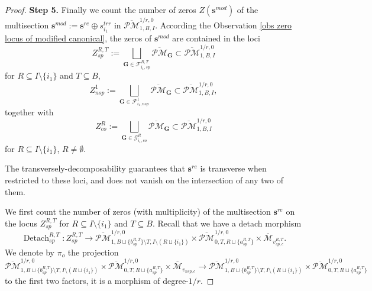 \documentclass[11pt]{amsart}
\theoremstyle{definition}
\theoremstyle{remark}
\newcommand{\oPMb}{{\overline{\mathcal{PM}}}}
\newcommand{\nontilde}{}
\newcommand{\<}{\left<}
\renewcommand{\>}{\right>}
\numberwithin{equation}{section}
\def\Mbar{{\overline{\mathcal M}}}
\begin{document}
\begin{proof}
        

    \noindent\textbf{Step 5.} 
        Finally we count the number of zeros $Z(\bm{s}^{mod})$ of the multisection $\bm{s}^{mod}:=\bm{s}^{re} \oplus \nontilde{s}^{trr}_{i_1}$ in $\oPMb^{1/r,0}_{1,B,I}$. According the Observation \ref{obs zero locus of modified canonical}, the zeros of $\bm{s}^{mod}$ are contained in the loci 
         $$
         Z_{sp}^{R,T}:=\bigsqcup_{\bm{G}\in \mathcal F^{R,T}_{i_1,sp}}\oPMb_{\bm{G}}\subset \oPMb_{1,B,I}^{1/r,0}
         $$
         for $R\subseteq I\setminus\{i_1\}$ and $T\subseteq B$,
          $$
         Z_{nsp}^{1}:=\bigsqcup_{\bm{G}\in \mathcal F^{1}_{i_1,nsp}}\oPMb_{\bm{G}}\subset \oPMb_{1,B,I}^{1/r,0},
         $$
         together with
         $$
         Z_{co}^{R}:=\bigsqcup_{\bm{G}\in \mathcal G^{R}_{i_1,co}}\oPMb_{\bm{G}}\subset \oPMb_{1,B,I}^{1/r,0}
         $$
        for $R\subseteq I\setminus\{i_1\}$, $R\ne \emptyset$.
         
         The transversely-decomposability guarantees that $\bm{s}^{re}$ is transverse when restricted to these loci, and does not vanish on the intersection of any two of them. 

         We first count the  number of zeros (with multiplicity) of the multisection $\bm{s}^{re}$ on the locus $Z_{sp}^{R,T}$ for  $R\subseteq I\setminus\{i_1\}$ and $T\subseteq B$. 
          Recall that we have a detach morphism 
         $$
         \operatorname{Detach}_{sp}^{R,T}\colon Z^{R,T}_{sp} \to \oPMb^{1/r,0}_{1,B\sqcup \{b^{R,T}_{sp}\} \setminus T,I\setminus (R\sqcup \{i_1\})} \times \oPMb^{1/r,0}_{0,T,R\sqcup \{a^{R,T}_{sp}\}}\times \Mbar_{v_{sp,c}^{R,T}}.
         $$
         We denote by $\pi_{o}$ the projection
         \begin{equation*}
              \oPMb^{1/r,0}_{1,B\sqcup \{b^{R,T}_{sp}\} \setminus T,I\setminus (R\sqcup \{i_1\})} \times \oPMb^{1/r,0}_{0,T,R\sqcup \{a^{R,T}_{sp}\}}\times \Mbar_{v_{nsp,c}} \to  \oPMb^{1/r,0}_{1,B\sqcup \{b^{R,T}_{sp}\} \setminus T,I\setminus (R\sqcup \{i_1\})} \times \oPMb^{1/r,0}_{0,T,R\sqcup \{a^{R,T}_{sp}\}}
         \end{equation*}
         to the first two factors, it is a morphism of degree-$1/r$.  


\end{proof}
\end{document}
